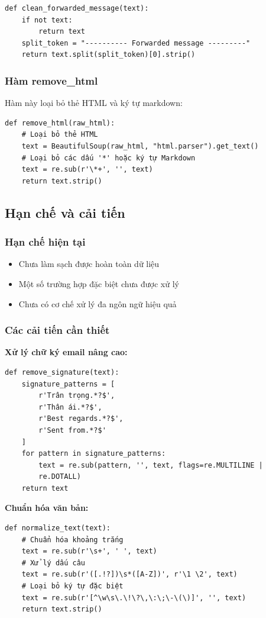 \documentclass[../DoAn.tex]{subfiles}
\begin{document}
\begin{verbatim}
def clean_forwarded_message(text):
    if not text:
        return text
    split_token = "---------- Forwarded message ---------"
    return text.split(split_token)[0].strip()
\end{verbatim}

\subsubsection{Hàm remove\_html}
Hàm này loại bỏ thẻ HTML và ký tự markdown:

\begin{verbatim}
def remove_html(raw_html):
    # Loại bỏ thẻ HTML
    text = BeautifulSoup(raw_html, "html.parser").get_text()
    # Loại bỏ các dấu '*' hoặc ký tự Markdown
    text = re.sub(r'\*+', '', text)
    return text.strip()
\end{verbatim}

\subsection{Hạn chế và cải tiến}

\subsubsection{Hạn chế hiện tại}
\begin{itemize}
    \item Chưa làm sạch được hoàn toàn dữ liệu
    \item Một số trường hợp đặc biệt chưa được xử lý
    \item Chưa có cơ chế xử lý đa ngôn ngữ hiệu quả
\end{itemize}

\subsubsection{Các cải tiến cần thiết}
\textbf{Xử lý chữ ký email nâng cao:}
\begin{verbatim}
def remove_signature(text):
    signature_patterns = [
        r'Trân trọng.*?$',
        r'Thân ái.*?$',
        r'Best regards.*?$',
        r'Sent from.*?$'
    ]
    for pattern in signature_patterns:
        text = re.sub(pattern, '', text, flags=re.MULTILINE | 
        re.DOTALL)
    return text
\end{verbatim}

\textbf{Chuẩn hóa văn bản:}
\begin{verbatim}
def normalize_text(text):
    # Chuẩn hóa khoảng trắng
    text = re.sub(r'\s+', ' ', text)
    # Xử lý dấu câu
    text = re.sub(r'([.!?])\s*([A-Z])', r'\1 \2', text)
    # Loại bỏ ký tự đặc biệt
    text = re.sub(r'[^\w\s\.\!\?\,\:\;\-\(\)]', '', text)
    return text.strip()
\end{verbatim}
\end{document}
